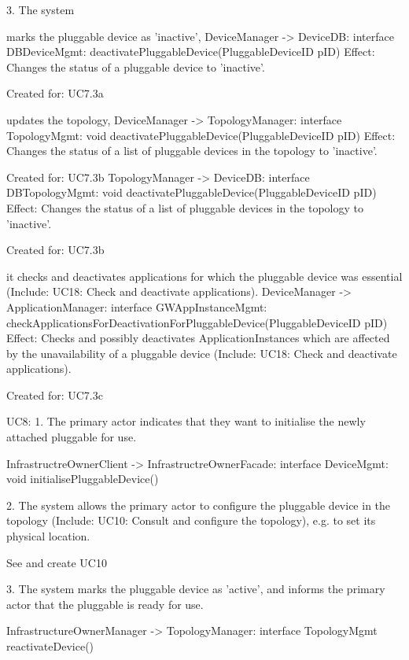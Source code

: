         3. The system
           { marks the pluggable device as 'inactive',
            DeviceManager -> DeviceDB: interface DBDeviceMgmt: deactivatePluggableDevice(PluggableDeviceID pID)
                Effect: Changes the status of a pluggable device to 'inactive'.
                \item Created for: UC7.3a

           { updates the topology,
            DeviceManager -> TopologyManager: interface TopologyMgmt: void deactivatePluggableDevice(PluggableDeviceID pID)
                Effect: Changes the status of a list of pluggable devices in the topology to 'inactive'.
                \item Created for: UC7.3b
            TopologyManager -> DeviceDB: interface DBTopologyMgmt: void deactivatePluggableDevice(PluggableDeviceID pID)
                Effect: Changes the status of a list of pluggable devices in the topology to 'inactive'.
                \item Created for: UC7.3b

           { it checks and deactivates applications for which the pluggable device was essential (Include: UC18: Check and deactivate applications).
            DeviceManager -> ApplicationManager: interface GWAppInstanceMgmt: checkApplicationsForDeactivationForPluggableDevice(PluggableDeviceID pID)
               Effect: Checks and possibly deactivates ApplicationInstances which are affected by the unavailability of a pluggable device (Include: UC18: Check and deactivate applications).
               \item Created for: UC7.3c


    UC8:
        1. The primary actor indicates that they want to initialise the newly attached pluggable for use.

            InfrastructreOwnerClient -> InfrastructreOwnerFacade: interface DeviceMgmt: void initialisePluggableDevice()

        2. The system allows the primary actor to configure the pluggable device in the topology (Include: UC10: Consult and configure the topology), e.g. to set its physical location.

             See and create UC10

        3. The system marks the pluggable device as 'active', and informs the primary actor that the pluggable is ready for use.

            InfrastructureOwnerManager -> TopologyManager: interface TopologyMgmt reactivateDevice()

}}}

